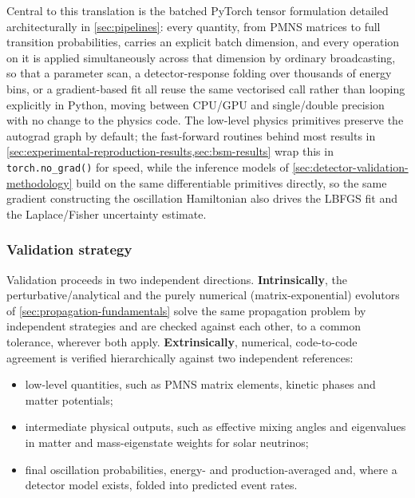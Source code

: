 Central to this translation is the batched PyTorch tensor formulation detailed architecturally in \cref{sec:pipelines}: every quantity, from PMNS matrices to full transition probabilities, carries an explicit batch dimension, and every operation on it is applied simultaneously across that dimension by ordinary broadcasting, so that a parameter scan, a detector-response folding over thousands of energy bins, or a gradient-based fit all reuse the same vectorised call rather than looping explicitly in Python, moving between CPU/GPU and single/double precision with no change to the physics code. The low-level physics primitives preserve the autograd graph by default; the fast-forward routines behind most results in \cref{sec:experimental-reproduction-results,sec:bsm-results} wrap this in \texttt{torch.no\_grad()} for speed, while the inference models of \cref{sec:detector-validation-methodology} build on the same differentiable primitives directly, so the same gradient constructing the oscillation Hamiltonian also drives the LBFGS fit and the Laplace/Fisher uncertainty estimate.

\subsubsection{Validation strategy}
\label{sec:validation-strategy}

Validation proceeds in two independent directions. \textbf{Intrinsically}, the perturbative/analytical and the purely numerical (matrix-exponential) evolutors of \cref{sec:propagation-fundamentals} solve the same propagation problem by independent strategies and are checked against each other, to a common tolerance, wherever both apply. \textbf{Extrinsically}, numerical, code-to-code agreement is verified hierarchically against two independent references:

\begin{itemize}
  \item low-level quantities, such as PMNS matrix elements, kinetic phases and matter potentials;
  \item intermediate physical outputs, such as effective mixing angles and eigenvalues in matter and mass-eigenstate weights for solar neutrinos;
  \item final oscillation probabilities, energy- and production-averaged and, where a detector model exists, folded into predicted event rates.
\end{itemize}

